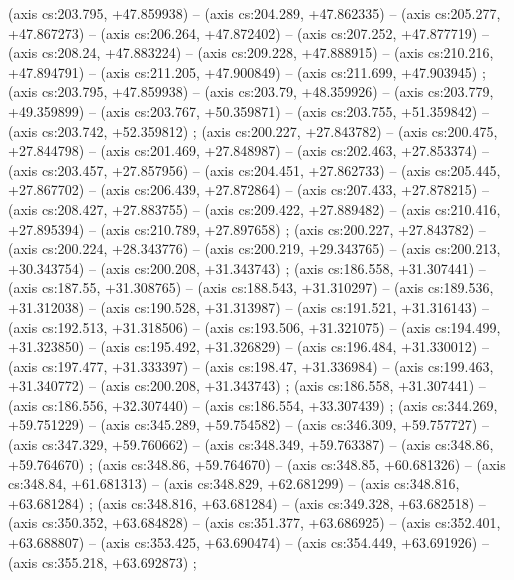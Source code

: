     (axis cs:203.795,    +47.859938) --  (axis cs:204.289,    +47.862335) --  (axis cs:205.277,    +47.867273) --  (axis cs:206.264,    +47.872402) --  (axis cs:207.252,    +47.877719) --  (axis cs:208.24,    +47.883224) --  (axis cs:209.228,    +47.888915) --  (axis cs:210.216,    +47.894791) --  (axis cs:211.205,    +47.900849) --  (axis cs:211.699,    +47.903945) ;
    (axis cs:203.795,    +47.859938) --  (axis cs:203.79,    +48.359926) --  (axis cs:203.779,    +49.359899) --  (axis cs:203.767,    +50.359871) --  (axis cs:203.755,    +51.359842) --  (axis cs:203.742,    +52.359812) ;
    (axis cs:200.227,    +27.843782) --  (axis cs:200.475,    +27.844798) --  (axis cs:201.469,    +27.848987) --  (axis cs:202.463,    +27.853374) --  (axis cs:203.457,    +27.857956) --  (axis cs:204.451,    +27.862733) --  (axis cs:205.445,    +27.867702) --  (axis cs:206.439,    +27.872864) --  (axis cs:207.433,    +27.878215) --  (axis cs:208.427,    +27.883755) --  (axis cs:209.422,    +27.889482) --  (axis cs:210.416,    +27.895394) --  (axis cs:210.789,    +27.897658) ;
    (axis cs:200.227,    +27.843782) --  (axis cs:200.224,    +28.343776) --  (axis cs:200.219,    +29.343765) --  (axis cs:200.213,    +30.343754) --  (axis cs:200.208,    +31.343743) ;
    (axis cs:186.558,    +31.307441) --  (axis cs:187.55,    +31.308765) --  (axis cs:188.543,    +31.310297) --  (axis cs:189.536,    +31.312038) --  (axis cs:190.528,    +31.313987) --  (axis cs:191.521,    +31.316143) --  (axis cs:192.513,    +31.318506) --  (axis cs:193.506,    +31.321075) --  (axis cs:194.499,    +31.323850) --  (axis cs:195.492,    +31.326829) --  (axis cs:196.484,    +31.330012) --  (axis cs:197.477,    +31.333397) --  (axis cs:198.47,    +31.336984) --  (axis cs:199.463,    +31.340772) --  (axis cs:200.208,    +31.343743) ;
    (axis cs:186.558,    +31.307441) --  (axis cs:186.556,    +32.307440) --  (axis cs:186.554,    +33.307439) ;
    (axis cs:344.269,    +59.751229) --  (axis cs:345.289,    +59.754582) --  (axis cs:346.309,    +59.757727) --  (axis cs:347.329,    +59.760662) --  (axis cs:348.349,    +59.763387) --  (axis cs:348.86,    +59.764670) ;
    (axis cs:348.86,    +59.764670) --  (axis cs:348.85,    +60.681326) --  (axis cs:348.84,    +61.681313) --  (axis cs:348.829,    +62.681299) --  (axis cs:348.816,    +63.681284) ;
    (axis cs:348.816,    +63.681284) --  (axis cs:349.328,    +63.682518) --  (axis cs:350.352,    +63.684828) --  (axis cs:351.377,    +63.686925) --  (axis cs:352.401,    +63.688807) --  (axis cs:353.425,    +63.690474) --  (axis cs:354.449,    +63.691926) --  (axis cs:355.218,    +63.692873) ;
